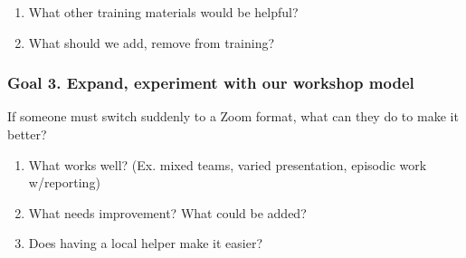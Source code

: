 \documentclass[
]{article}
\providecommand{\tightlist}{%
  \setlength{\itemsep}{0pt}\setlength{\parskip}{0pt}}
\begin{document}
\begin{enumerate}
\def\labelenumi{\arabic{enumi}.}
\tightlist
\item
  What other training materials would be helpful?
\item
  What should we add, remove from training?
\end{enumerate}

\hypertarget{goal-3.-expand-experiment-with-our-workshop-model}{%
\subsubsection{Goal 3. Expand, experiment with our workshop
model}\label{goal-3.-expand-experiment-with-our-workshop-model}}

If someone must switch suddenly to a Zoom format, what can they do to
make it better?

\begin{enumerate}
\def\labelenumi{\arabic{enumi}.}
\tightlist
\item
  What works well? (Ex. mixed teams, varied presentation, episodic work
  w/reporting)
\item
  What needs improvement? What could be added?
\item
  Does having a local helper make it easier?
\end{enumerate}
\end{document}
